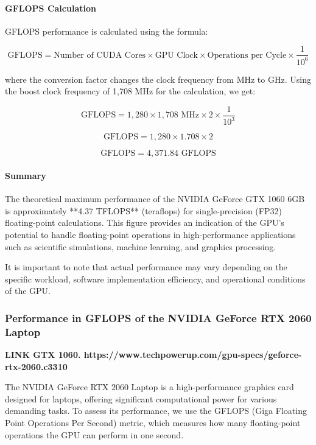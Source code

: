 \paragraph{GFLOPS Calculation}

GFLOPS performance is calculated using the formula:

\[
\text{GFLOPS} = \text{Number of CUDA Cores} \times \text{GPU Clock} \times \text{Operations per Cycle} \times \frac{1}{10^6}
\]

where the conversion factor changes the clock frequency from MHz to GHz. Using the boost clock frequency of 1,708 MHz for the calculation, we get:

\[
\text{GFLOPS} = 1,280 \times 1,708 \text{ MHz} \times 2 \times \frac{1}{10^3}
\]

\[
\text{GFLOPS} = 1,280 \times 1.708 \times 2
\]

\[
\text{GFLOPS} = 4,371.84 \text{ GFLOPS}
\]

\paragraph{Summary}

The theoretical maximum performance of the NVIDIA GeForce GTX 1060 6GB is approximately **4.37 TFLOPS** (teraflops) for single-precision (FP32) floating-point calculations. This figure provides an indication of the GPU's potential to handle floating-point operations in high-performance applications such as scientific simulations, machine learning, and graphics processing.

It is important to note that actual performance may vary depending on the specific workload, software implementation efficiency, and operational conditions of the GPU.

\subsubsection{Performance in GFLOPS of the NVIDIA GeForce RTX 2060 Laptop}

\textbf{LINK GTX 1060. https://www.techpowerup.com/gpu-specs/geforce-rtx-2060.c3310}

The NVIDIA GeForce RTX 2060 Laptop is a high-performance graphics card designed for laptops, offering significant computational power for various demanding tasks. To assess its performance, we use the GFLOPS (Giga Floating Point Operations Per Second) metric, which measures how many floating-point operations the GPU can perform in one second.

